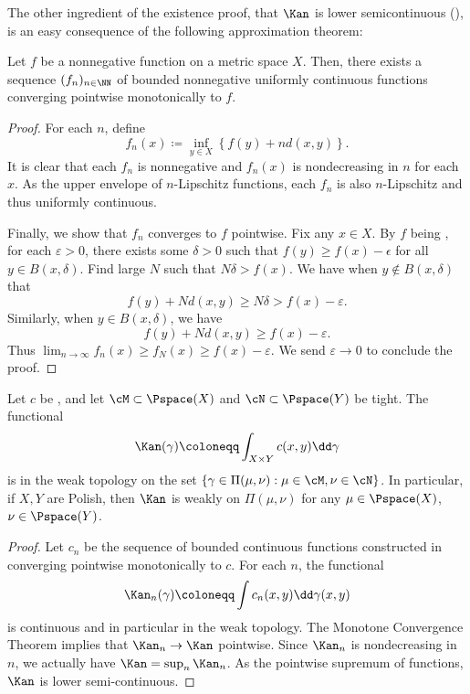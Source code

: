 \documentclass[oneside,reqno,letterpaper]{amsart}
\begin{document}
The other ingredient of the existence proof, that \(\Kan\) is lower semicontinuous (\lsc), is an easy consequence of the following approximation theorem:
\begin{lemma}\label{prop:lsc-approx-by-uc}
  Let \(f\) be a nonnegative \lsc function on a metric space \(X\).
  Then, there exists a sequence \((f_n)_{n \in \NN}\) of bounded nonnegative uniformly continuous functions converging pointwise monotonically to \(f\).
\end{lemma}
\begin{proof}
  For each \(n\), define
  \[
    f_n(x) \coloneqq \inf_{y \in X} \left\{ f(y) + n d(x, y) \right\}.
  \]
  It is clear that each \(f_n\) is nonnegative and \(f_n(x)\) is nondecreasing in \(n\) for each \(x\).
  As the upper envelope of \(n\)-Lipschitz functions, each \(f_n\) is also \(n\)-Lipschitz and thus uniformly continuous.

  Finally, we show that \(f_n\) converges to \(f\) pointwise.
  Fix any \(x \in X\).
  By \(f\) being \lsc, for each \(\varepsilon > 0\), there exists some \(\delta > 0\) such that \(f(y) \geq f(x) - \epsilon\) for all \(y \in B(x, \delta)\).
  Find large \(N\) such that \(N \delta > f(x)\).
  We have when \(y \notin B(x, \delta)\) that
  \[
    f(y) + N d(x, y)
    \geq N \delta
    > f(x) - \varepsilon.
  \]
  Similarly, when \(y \in B(x, \delta)\), we have
  \[
    f(y) + N d(x, y)
    \geq f(x) - \varepsilon.
  \]
  Thus \(\lim_{n \to \infty} f_n(x) \geq f_N(x) \geq f(x) - \varepsilon\).
  We send \(\varepsilon \to 0\) to conclude the proof.
\end{proof}
\begin{corollary}\label{prop:Kan-lsc}
  Let \(c\) be \lsc, and let \(\cM \subset \Pspace(X)\) and \(\cN \subset \Pspace(Y)\) be tight.
  The functional
  \[
    \Kan(\gamma) \coloneqq \int_{X \times Y} c(x, y) \dd \gamma
  \]
  is \lsc in the weak topology on the set \(\left\{\gamma \in \Pi(\mu, \nu) : \mu \in \cM, \nu \in \cN \right\}\).
  In particular, if \(X, Y\) are Polish, then \(\Kan\) is weakly \lsc on \(\Pi(\mu, \nu)\) for any \(\mu \in \Pspace(X)\), \(\nu \in \Pspace(Y)\).
\end{corollary}
\begin{proof}
  Let \(c_n\) be the sequence of bounded continuous functions constructed in  converging pointwise monotonically to \(c\).
  For each \(n\), the functional
  \[
    \Kan_n(\gamma) \coloneqq \int c_n(x, y) \dd \gamma(x, y)
  \]
  is continuous and in particular \lsc in the weak topology.
  The Monotone Convergence Theorem implies that \(\Kan_n \to \Kan\) pointwise.
  Since \(\Kan_n\) is nondecreasing in \(n\), we actually have \(\Kan = \sup_n \Kan_n\). %
  As the pointwise supremum of \lsc functions, \(\Kan\) is lower semi-continuous.
\end{proof}
\end{document}

